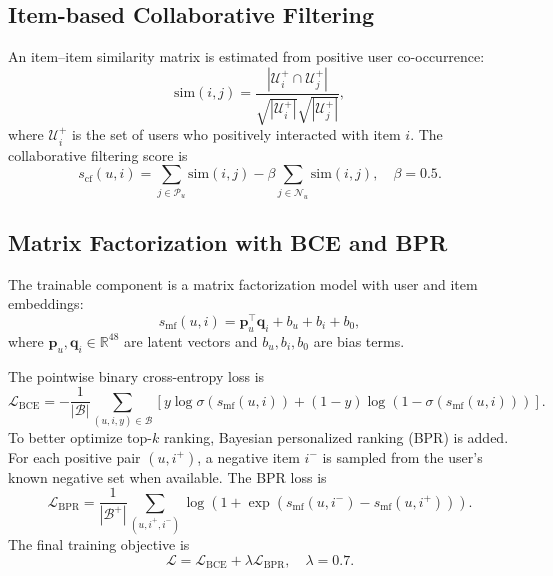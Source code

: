 \documentclass[onecolumn,a4paper,12pt]{IEEEtran}
\begin{document}
\subsection{Item-based Collaborative Filtering}

An item--item similarity matrix is estimated from positive user co-occurrence:
\begin{equation}
    \mathrm{sim}(i,j)=
    \frac{|\mathcal{U}_i^{+}\cap \mathcal{U}_j^{+}|}
    {\sqrt{|\mathcal{U}_i^{+}|}\sqrt{|\mathcal{U}_j^{+}|}},
\end{equation}
where $\mathcal{U}_i^{+}$ is the set of users who positively interacted with item $i$. The collaborative filtering score is
\begin{equation}
    s_{\mathrm{cf}}(u,i)=
    \sum_{j\in\mathcal{P}_u}\mathrm{sim}(i,j)
    -
    \beta\sum_{j\in\mathcal{N}_u}\mathrm{sim}(i,j),
    \quad \beta=0.5.
\end{equation}

\subsection{Matrix Factorization with BCE and BPR}

The trainable component is a matrix factorization model with user and item embeddings:
\begin{equation}
    s_{\mathrm{mf}}(u,i)
    =
    \mathbf{p}_u^\top \mathbf{q}_i
    +
    b_u+b_i+b_0,
\end{equation}
where $\mathbf{p}_u,\mathbf{q}_i\in\mathbb{R}^{48}$ are latent vectors and $b_u,b_i,b_0$ are bias terms.

The pointwise binary cross-entropy loss is
\begin{equation}
    \mathcal{L}_{\mathrm{BCE}}
    =
    -\frac{1}{|\mathcal{B}|}
    \sum_{(u,i,y)\in\mathcal{B}}
    \left[
    y\log\sigma(s_{\mathrm{mf}}(u,i))
    +(1-y)\log(1-\sigma(s_{\mathrm{mf}}(u,i)))
    \right].
\end{equation}
To better optimize top-$k$ ranking, Bayesian personalized ranking (BPR) is added. For each positive pair $(u,i^+)$, a negative item $i^-$ is sampled from the user's known negative set when available. The BPR loss is
\begin{equation}
    \mathcal{L}_{\mathrm{BPR}}
    =
    \frac{1}{|\mathcal{B}^{+}|}
    \sum_{(u,i^+,i^-)}
    \log\left(1+\exp\left(s_{\mathrm{mf}}(u,i^-)-s_{\mathrm{mf}}(u,i^+)\right)\right).
\end{equation}
The final training objective is
\begin{equation}
    \mathcal{L}
    =
    \mathcal{L}_{\mathrm{BCE}}
    +
    \lambda \mathcal{L}_{\mathrm{BPR}},
    \quad \lambda=0.7.
\end{equation}
\end{document}
